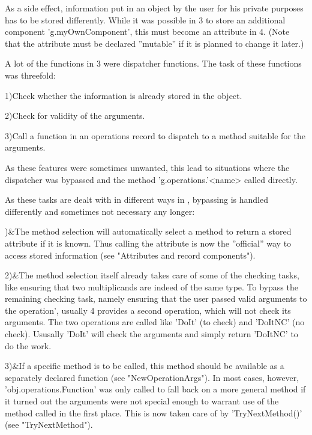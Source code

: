As a side effect, information put in an object by the user for his
private purposes has to be stored differently. While it was possible in
{\GAP}3 to store an additional component 'g.myOwnComponent', this must
become an attribute in {\GAP}4. (Note that the attribute must be declared
''mutable'' if it is planned to change it later.)


A lot of the functions in {\GAP}3 were dispatcher functions. The task of
these functions was threefold:

1)\quad Check whether the information is already stored in the object.

2)\quad Check for validity of the arguments.

3)\quad Call a function in an operations record to dispatch to a method suitable
for the arguments.

As these features were sometimes unwanted, this lead to situations where
the dispatcher was bypassed and the method 'g.operations.'<name> called
directly.

As these tasks are dealt with in different ways in {}, bypassing is
handled differently and sometimes not necessary any longer:

)&The method selection will automatically select a method to return a
stored attribute if it is known. Thus calling the attribute is now the
''official'' way to access stored information (see "Attributes and record
components").

2)&The method selection itself already takes care of some of the checking
tasks, like ensuring that two multiplicands are indeed of the same type. To
bypass the remaining checking task, namely ensuring that the user passed
valid arguments to the operation', usually {\GAP}4 provides a second
operation, which will not check its arguments.
The two operations are called like 'DoIt' (to check) and 'DoItNC' (no
check). Ususally 'DoIt' will check the arguments and simply return 'DoItNC'
to do the work.

3)&If a specific method is to be called, this method should be available as a
separately declared function (see "NewOperationArgs"). In most cases, however,
'obj.operations.Function' was only called to fall back on a more general
method if it turned out the arguments were not special enough to warrant use
of the method called in the first place. This is now taken care of by
'TryNextMethod()' (see "TryNextMethod").

